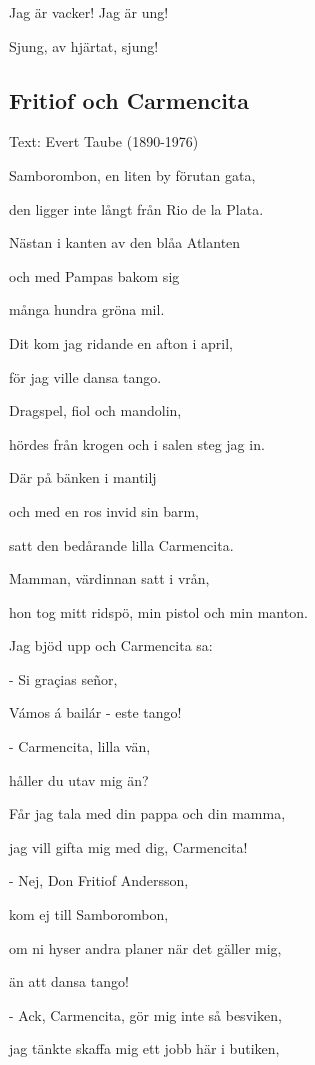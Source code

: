 Jag är vacker! Jag är ung!

Sjung, av hjärtat, sjung!\bigskip

\subsection{\textbf{Fritiof och Carmencita}}

Text: Evert Taube (1890-1976)\bigskip

Samborombon, en liten by förutan gata,

den ligger inte långt från Rio de la Plata.

Nästan i kanten av den blåa Atlanten

och med Pampas bakom sig

många hundra gröna mil.

Dit kom jag ridande en afton i april,

för jag ville dansa tango. \bigskip



Dragspel, fiol och mandolin,

hördes från krogen och i salen steg jag in.

Där på bänken i mantilj

och med en ros invid sin barm,

satt den bedårande lilla Carmencita.

Mamman, värdinnan satt i vrån,

hon tog mitt ridspö, min pistol och min 
manton.

Jag bjöd upp och Carmencita sa:

- Si graçias señor,

Vámos á bailár - este tango!\bigskip



- Carmencita, lilla vän,

håller du utav mig än?

Får jag tala med din pappa och din mamma,

jag vill gifta mig med dig, Carmencita!

- Nej, Don Fritiof Andersson,

kom ej till Samborombon, \bigskip



om ni hyser andra planer när det gäller mig,

än att dansa tango!\bigskip



- Ack, Carmencita, gör mig inte så besviken,

jag tänkte skaffa mig ett jobb här i 
butiken,

